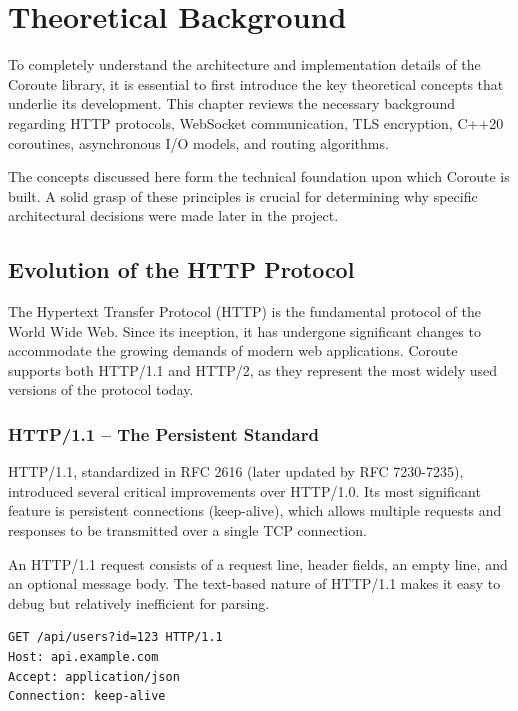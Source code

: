 \section{Theoretical Background}
\label{sec:theoretical_background}

To completely understand the architecture and implementation details of the Coroute library, it is essential to first introduce the key theoretical concepts that underlie its development. This chapter reviews the necessary background regarding HTTP protocols, WebSocket communication, TLS encryption, C++20 coroutines, asynchronous I/O models, and routing algorithms.

The concepts discussed here form the technical foundation upon which Coroute is built. A solid grasp of these principles is crucial for determining why specific architectural decisions were made later in the project.

\subsection{Evolution of the HTTP Protocol}

The Hypertext Transfer Protocol (HTTP) is the fundamental protocol of the World Wide Web. Since its inception, it has undergone significant changes to accommodate the growing demands of modern web applications. Coroute supports both HTTP/1.1 and HTTP/2, as they represent the most widely used versions of the protocol today.

\subsubsection{HTTP/1.1 -- The Persistent Standard}

HTTP/1.1, standardized in RFC 2616 (later updated by RFC 7230-7235), introduced several critical improvements over HTTP/1.0. Its most significant feature is persistent connections (keep-alive), which allows multiple requests and responses to be transmitted over a single TCP connection.

An HTTP/1.1 request consists of a request line, header fields, an empty line, and an optional message body. The text-based nature of HTTP/1.1 makes it easy to debug but relatively inefficient for parsing.

\begin{lstlisting}[basicstyle=\small\ttfamily, caption={Example HTTP/1.1 Request}]
GET /api/users?id=123 HTTP/1.1
Host: api.example.com
Accept: application/json
Connection: keep-alive

\end{lstlisting}

